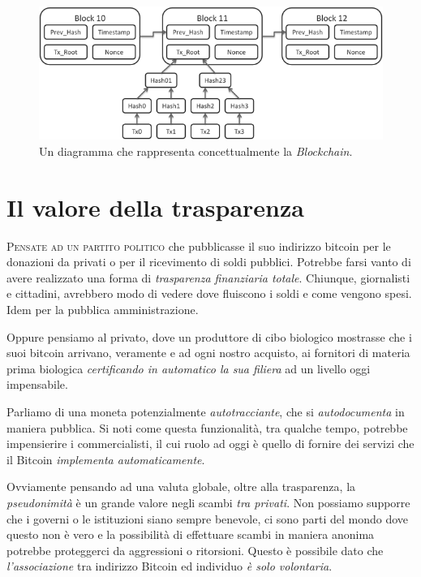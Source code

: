 \documentclass[a4paper,12pt,italian]{article}
\begin{document}
\begin{figure}
\centering
\includegraphics[width=\linewidth]{figures/Bitcoin-Block-Data.png}
\caption{Un diagramma che rappresenta concettualmente la \emph{Blockchain}.}
\end{figure}

\bigskip

\section*{Il valore della trasparenza}

\lettrine{P}{ensate ad un partito politico} che pubblicasse il suo indirizzo bitcoin
per le donazioni da privati o per il ricevimento di soldi pubblici. Potrebbe
farsi vanto di avere realizzato una forma di \emph{trasparenza finanziaria
totale}. Chiunque, giornalisti e cittadini, avrebbero modo di vedere
dove fluiscono i soldi e come vengono spesi. Idem per la pubblica
amministrazione.

\smallskip

Oppure pensiamo al privato, dove un produttore di cibo biologico
mostrasse che i suoi bitcoin arrivano, veramente e ad ogni nostro
acquisto, ai fornitori di materia prima biologica \emph{certificando in
automatico la sua filiera} ad un livello oggi impensabile.


\bigskip

Parliamo di una moneta potenzialmente \emph{autotracciante}, che si
\emph{autodocumenta} in maniera pubblica. Si noti come questa funzionalità,
tra qualche tempo, potrebbe impensierire i commercialisti, il cui ruolo
ad oggi è quello di fornire dei servizi che il Bitcoin \emph{implementa
automaticamente}.


\bigskip

Ovviamente pensando ad una valuta globale, oltre alla trasparenza, la
\emph{pseudonimità} è un grande valore negli scambi \emph{tra privati}. Non possiamo
supporre che i governi o le istituzioni siano sempre benevole, ci sono
parti del mondo dove questo non è vero e la possibilità di effettuare
scambi in maniera anonima potrebbe proteggerci da aggressioni o
ritorsioni. Questo è possibile dato che \emph{l’associazione} tra indirizzo
Bitcoin ed individuo \emph{è solo volontaria}.
\end{document}
